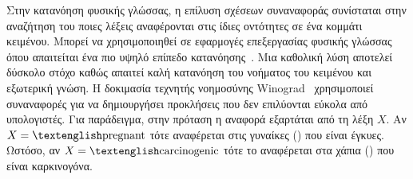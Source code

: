 Στην κατανόηση φυσικής γλώσσας, η επίλυση σχέσεων συναναφοράς συνίσταται στην αναζήτηση του ποιες λέξεις αναφέρονται στις ίδιες οντότητες σε ένα κομμάτι κειμένου.
Μπορεί να χρησιμοποιηθεί σε εφαρμογές επεξεργασίας φυσικής γλώσσας όπου απαιτείται ένα πιο υψηλό επίπεδο κατανόησης~\cite{peng2015solving}.
Μια καθολική λύση αποτελεί δύσκολο στόχο καθώς απαιτεί καλή κατανόηση του νοήματος του κειμένου και εξωτερική γνώση.
Η δοκιμασία τεχνητής νοημοσύνης Winograd~\cite{levesque2012winograd} χρησιμοποιεί συναναφορές για να δημιουργήσει προκλήσεις που δεν επιλύονται εύκολα από υπολογιστές.
Για παράδειγμα, στην πρόταση  η αναφορά  εξαρτάται από τη λέξη $X$.
Αν $X = \text{\en{pregnant}}$ τότε αναφέρεται στις γυναίκες () που είναι έγκυες.
Ωστόσο, αν $X = \text{\en{carcinogenic}}$ τότε το  αναφέρεται στα χάπια () που είναι καρκινογόνα.

